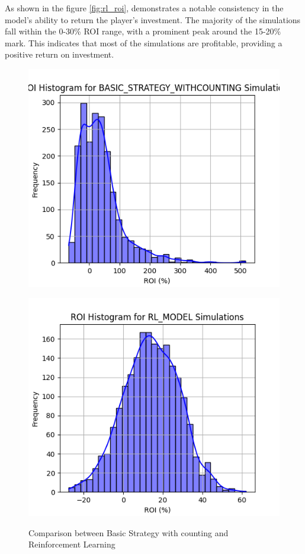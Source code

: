 \documentclass[a4paper,12pt]{report}
\begin{document}
As shown in the figure \ref{fig:rl_roi}, demonstrates a notable consistency in the model's ability to return the player's investment. The majority of the simulations fall within the 0-30\% ROI range, with a prominent peak around the 15-20\% mark. This indicates that most of the simulations are profitable, providing a positive return on investment.


\begin{figure}[h]
    \begin{minipage}{0.45\textwidth}
        \centering
        \includegraphics[scale=0.5]{figures/graphs/rl_vs_bsc_roi1.png}
        \label{fig:ah_roi_left}
    \end{minipage}
    \begin{minipage}{0.45\textwidth}
        \includegraphics[scale=0.5]{figures/graphs/rl_roi.png}
        \label{fig:bswc_roi_right}
    \end{minipage}
\label{fig:comparison_roi}
\caption{Comparison between Basic Strategy with counting and Reinforcement Learning}
\end{figure}
\end{document}
